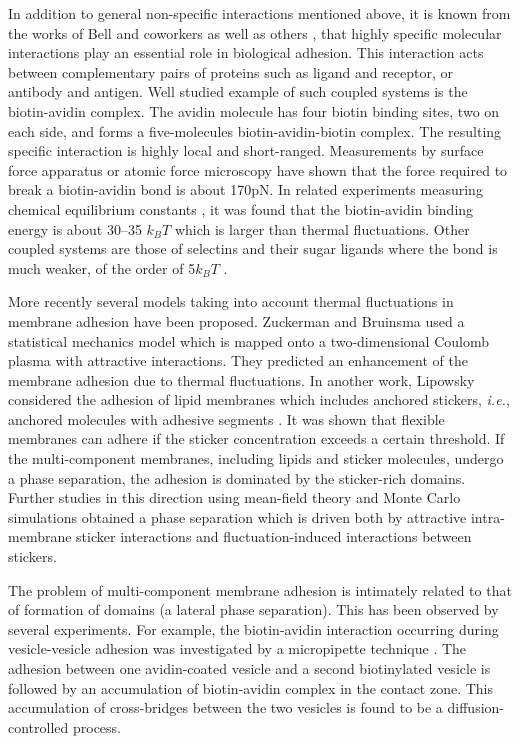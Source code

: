 In addition to general non-specific interactions
mentioned above, it is known from the works of Bell and coworkers
\cite{Bell,BDB} as well as others \cite{Evans},
that highly
specific molecular interactions play an essential role in
biological adhesion.
This interaction acts between complementary pairs of proteins
such as ligand and receptor, or antibody and antigen.
Well studied example of such coupled systems is the biotin-avidin complex.
The avidin molecule has four biotin binding sites, two on each side,
and forms a five-molecules biotin-avidin-biotin complex.
The resulting specific interaction is highly
local and short-ranged.
Measurements by surface force apparatus \cite{LISK} or atomic force
microscopy \cite{FMG,MFG} have shown that the  force required to
break a biotin-avidin bond is about 170pN.
In related experiments measuring chemical equilibrium constants \cite{M},
it was found that
the biotin-avidin binding energy is about 30--35 $k_BT$ which is larger
than thermal fluctuations. Other coupled systems are those of selectins and
their sugar ligands where the bond is much weaker, of the order of
5$k_B T$ \cite{ZB95,ZB98}.


More recently several models taking into account thermal fluctuations in
membrane adhesion have been proposed. Zuckerman and Bruinsma
\cite{ZB95,ZB98} used a statistical mechanics model which is  mapped
onto a two-dimensional Coulomb plasma with attractive interactions.
They predicted an enhancement of the membrane adhesion due to thermal
fluctuations.
In another work, Lipowsky considered the adhesion of lipid
membranes which includes anchored stickers, {\it i.e.}, anchored molecules
with adhesive segments \cite{Lipowsky96,Lipowsky97}. It was shown that
flexible membranes can adhere if the sticker concentration exceeds a
certain threshold.
If the multi-component membranes, including lipids and
sticker molecules, undergo a phase separation, the adhesion is dominated
by the sticker-rich domains.
Further studies in this direction using
mean-field theory and Monte Carlo simulations \cite{WNL} obtained a phase
separation which is driven both by attractive intra-membrane sticker
interactions and fluctuation-induced interactions between stickers.


The problem of multi-component membrane adhesion is intimately related to
that of formation of domains (a lateral phase separation).
This has been observed by several experiments.
For example, the biotin-avidin interaction occurring during vesicle-vesicle
adhesion was investigated by a micropipette technique \cite{NN}.
The adhesion between one avidin-coated vesicle and a second biotinylated
vesicle is followed by an accumulation of biotin-avidin complex in the
contact zone.
This accumulation of cross-bridges between the two vesicles
is found to be a diffusion-controlled
process.


